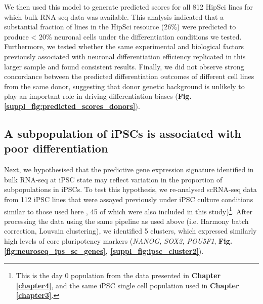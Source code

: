 We then used this model to generate predicted scores for all 812 HipSci lines for which bulk RNA-seq data was available.
This analysis indicated that a substantial fraction of lines in the HipSci resource (26\%) were predicted to produce < 20\% neuronal cells under the differentiation conditions we tested.
Furthermore, we tested whether the same experimental and biological factors previously associated with neuronal differentiation efficiency replicated in this larger sample and found consistent results.
Finally, we did not observe strong concordance between the predicted differentiation outcomes of different cell lines from the same donor, suggesting that donor genetic background is unlikely to play an important role in driving differentiation biases (\textbf{Fig. \ref{suppl_fig:predicted_scores_donors}}).


\newpage

\subsection{A subpopulation of iPSCs is associated with poor differentiation}

Next, 
we hypothesised that the predictive gene expression signature identified in bulk RNA-seq at iPSC state may reflect variation in the proportion of subpopulations in iPSCs. 
To test this hypothesis, we re-analysed scRNA-seq data from 112 iPSC lines that were assayed previously under iPSC culture conditions similar to those used here \cite{cuomo2020single}, 45 of which were also included in this study)\footnote{This is the day 0 population from the data presented in \textbf{Chapter \ref{chapter4}}, and the same iPSC single cell population used in \textbf{Chapter \ref{chapter3}}.}. 
After processing the data using the same pipeline as used above (i.e. Harmony batch correction, Louvain clustering),
we identified 5 clusters, 
which expressed similarly high levels of core pluripotency markers (\textit{NANOG, SOX2, POU5F1}, \textbf{Fig. \ref{fig:neuroseq_ips_sc_genes}, \ref{suppl_fig:ipsc_cluster2}}). \\

